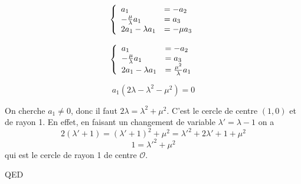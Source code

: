 \documentclass[]{book}
\theoremstyle{definition}
\begin{document}
$$ 
\left\{ 
\begin{array}{l l}
a_1  & = - a_2\\
-\frac{\mu}{\lambda}a_1  & =  a_3\\
2a_1 - \lambda a_1 & =  -\mu a_3\\
\end{array}
\right. 
$$ 

$$ 
\left\{ 
\begin{array}{l l}
a_1  & = - a_2\\
-\frac{\mu}{\lambda}a_1  & =  a_3\\
2a_1 - \lambda a_1 & =  \frac{\mu^2}{\lambda}a_1\\
\end{array}
\right. 
$$ 

$$a_1(2\lambda -\lambda^2 - \mu^2) = 0 $$

On cherche $a_1 \neq 0$, donc il faut $2\lambda = \lambda^2 + \mu^2$. C'est le cercle de centre $(1,0)$ et de rayon 1.
En effet, en faisant un changement de variable $\lambda'= \lambda-1$ on a 
$$
2(\lambda'+1) = (\lambda'+1)^2+\mu^2 = \lambda'^2+2\lambda'+1+\mu^2$$
$$1=\lambda'^2+\mu^2$$
qui est le cercle de rayon 1 de centre $\mathscr{O}$.

QED
\end{document}
